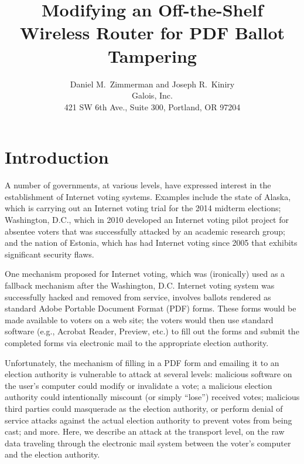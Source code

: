 \documentclass{article}
\newcommand{\eg}{e.g.,\xspace}
\newcommand{\etc}{etc.\xspace}
\begin{document}
\title{Modifying an Off-the-Shelf Wireless Router for PDF Ballot Tampering}
\author{Daniel M.~Zimmerman and Joseph R.~Kiniry \\ Galois, Inc. \\
  421 SW 6th Ave., Suite 300, Portland, OR 97204}

\maketitle


\section{Introduction}

A number of governments, at various levels, have expressed interest in
the establishment of Internet voting systems. Examples include the
state of Alaska, which is carrying out an Internet voting trial for
the 2014 midterm elections; Washington, D.C., which in 2010 developed
an Internet voting pilot project for absentee voters that was
successfully attacked by an academic research group;~\cite{DCVoting}
and the nation of Estonia, which has had Internet voting since 2005
that exhibits significant security flaws.~\cite{EstoniaEVoting}

One mechanism proposed for Internet voting, which was (ironically)
used as a fallback mechanism after the Washington, D.C. Internet
voting system was successfully hacked and removed from service,
involves ballots rendered as standard Adobe Portable Document Format
(PDF) forms. These forms would be made available to voters on a web
site; the voters would then use standard software (\eg Acrobat Reader,
Preview, \etc) to fill out the forms and submit the completed forms
via electronic mail to the appropriate election authority.

Unfortunately, the mechanism of filling in a PDF form and emailing it
to an election authority is vulnerable to attack at several levels:
malicious software on the user's computer could modify or invalidate a
vote; a malicious election authority could intentionally miscount (or
simply ``lose'') received votes; malicious third parties could
masquerade as the election authority, or perform denial of service
attacks against the actual election authority to prevent votes from
being cast; and more. Here, we describe an attack at the transport
level, on the raw data traveling through the electronic mail system
between the voter's computer and the election authority.
\end{document}
